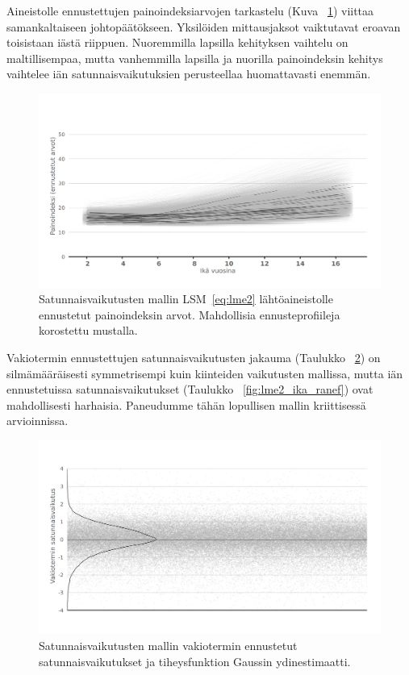 \documentclass[finnish]{docopts}
\begin{document}
Aineistolle ennustettujen painoindeksiarvojen tarkastelu (Kuva ~\ref{fig:lme2_bmi_pred}) viittaa samankaltaiseen johtopäätökseen. Yksilöiden mittausjaksot vaiktutavat eroavan toisistaan iästä riippuen. Nuoremmilla lapsilla kehityksen vaihtelu on maltillisempaa, mutta vanhemmilla lapsilla ja nuorilla painoindeksin kehitys vaihtelee iän satunnaisvaikutuksien perusteellaa huomattavasti enemmän.\\

\begin{figure}[H]
\centering
  \includegraphics[scale=0.8]{kuvaajat/lme2_bmi_ennuste.png}
  \caption{Satunnaisvaikutusten mallin LSM~\ref{eq:lme2} lähtöaineistolle ennustetut painoindeksin arvot. Mahdollisia ennusteprofiileja korostettu mustalla.}
  \label{fig:lme2_bmi_pred}
\end{figure}

Vakiotermin ennustettujen satunnaisvaikutusten jakauma (Taulukko ~\ref{fig:lme2_vakio_ranef}) on silmämääräisesti symmetrisempi kuin kiinteiden vaikutusten mallissa, mutta iän ennustetuissa satunnaisvaikutukset (Taulukko ~\ref{fig:lme2_ika_ranef}) ovat mahdollisesti harhaisia. Paneudumme tähän lopullisen mallin kriittisessä arvioinnissa.\\

\begin{figure}[H]
\centering
  \includegraphics[scale=0.8]{kuvaajat/lme2_vakio_satunnaisvaikutukset.png}
  \caption{Satunnaisvaikutusten mallin vakiotermin ennustetut satunnaisvaikutukset ja tiheysfunktion Gaussin ydinestimaatti.}
  \label{fig:lme2_vakio_ranef}
\end{figure}
\end{document}
